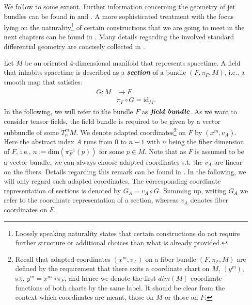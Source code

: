 We follow \cite{1998physics...1019G} to some extent. Further information concerning the geometry of jet bundles can be found in \cite{saunders_1989} and \cite{seiler2009involution}. A more sophisticated treatment with the focus lying on the naturality\footnote{Loosely speaking naturality states that certain constructions do not require further structure or additional choices than what is already provided.} of certain constructions that we are going to meet in the next chapters can be found in \cite{kolar1993natural}. Many details regarding the involved standard differential geometry are concisely collected in \cite{doi:10.1142/3867}.

Let $M$ be an oriented 4-dimensional manifold that represents spacetime. A field that inhabits spacetime is described as a \textit{\textbf{section}} of a bundle $(F,\pi_F,M)$, i.e., a smooth map that satisfies:
\begin{align}
\begin{aligned}
G : M &\longrightarrow F\\
& \pi_F \circ G = \mathrm{id}_M.
\end{aligned}
\end{align}
In the following, we will refer to the bundle $F$ as $\textit{\textbf{field bundle}}$.  As we want to consider tensor fields, the field bundle is required to be given by a vector subbundle of some $T^m_n M$. We denote adapted coordinates\footnote{Recall that adapted coordinates $(x^m,v_A)$ on a fiber bundle $(F, \pi_F, M)$ are defined by the requirement that there exits a coordinate chart on $M$, $(y^m)$, s.t. $y^m = x^m \circ \pi_F$, and hence we denote the first $dim(M)$ coordinate functions of both charts by the same label. It should be clear from the context which coordinates are meant, those on $M$ or those on $F$.} on $F$ by $(x^m,v_A)$. Here the abstract index $A$ runs from $0$ to $n - 1$ with $n$ being the fiber dimension of $F$, i.e., $n := \mathrm{dim}(\pi_F^{-1}(p))$ for some $p \in M$. Note that as $F$ is assumed to be a vector bundle, we can always choose adapted coordinates s.t. the $v_A$ are linear on the fibers. Details regarding this remark can be found in \cite{saunders_1989}. In the following, we will only regard such adapted coordinates. The corresponding coordinate representation of sections is denoted by $G_A = v_A \circ G $. Summing up, writing $G_A$ we refer to the coordinate representation of a section, whereas $v_A$ denotes fiber coordinates on $F$.

